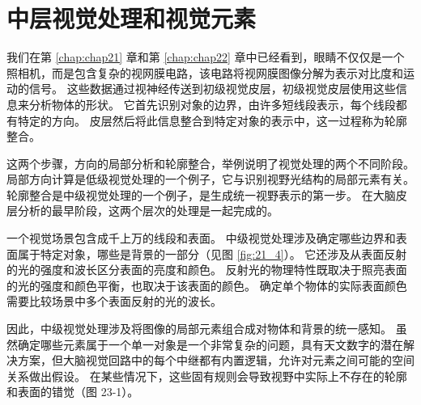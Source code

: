 \chapter{中层视觉处理和视觉元素} \label{chap:chap23}
我们在第 \ref{chap:chap21} 章和第 \ref{chap:chap22} 章中已经看到，眼睛不仅仅是一个照相机，而是包含复杂的视网膜电路，该电路将视网膜图像分解为表示对比度和运动的信号。 
这些数据通过视神经传送到初级视觉皮层，初级视觉皮层使用这些信息来分析物体的形状。 
它首先识别对象的边界，由许多短线段表示，每个线段都有特定的方向。 
皮层然后将此信息整合到特定对象的表示中，这一过程称为轮廓整合。


这两个步骤，方向的局部分析和轮廓整合，举例说明了视觉处理的两个不同阶段。 
局部方向计算是低级视觉处理的一个例子，它与识别视野光结构的局部元素有关。 
轮廓整合是中级视觉处理的一个例子，是生成统一视野表示的第一步。 
在大脑皮层分析的最早阶段，这两个层次的处理是一起完成的。


一个视觉场景包含成千上万的线段和表面。 
中级视觉处理涉及确定哪些边界和表面属于特定对象，哪些是背景的一部分（见图 \ref{fig:21_4}）。 
它还涉及从表面反射的光的强度和波长区分表面的亮度和颜色。 
反射光的物理特性既取决于照亮表面的光的强度和颜色平衡，也取决于该表面的颜色。 
确定单个物体的实际表面颜色需要比较场景中多个表面反射的光的波长。


因此，中级视觉处理涉及将图像的局部元素组合成对物体和背景的统一感知。 
虽然确定哪些元素属于一个单一对象是一个非常复杂的问题，具有天文数字的潜在解决方案，但大脑视觉回路中的每个中继都有内置逻辑，允许对元素之间可能的空间关系做出假设。
在某些情况下，这些固有规则会导致视野中实际上不存在的轮廓和表面的错觉（图 23-1）。


